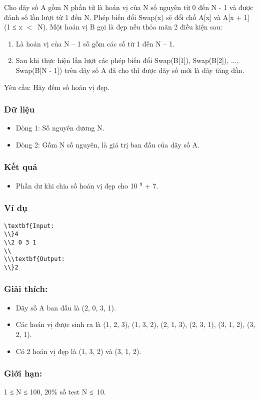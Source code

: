 



   Cho dãy số A gồm N phần tử là hoán vị của N số nguyên từ 0 đến N - 1 và được đánh số lần lượt từ 1 đến N. Phép biến đổi Swap(x) sẽ đổi chỗ A[x] và A[x + 1] (1 ≤ x $<$ N). Một hoán vị B gọi là đẹp nếu thỏa mãn 2 điều kiện sau:  
\begin{enumerate}
	\item     Là hoán vị của N – 1 số gồm các số từ 1 đến N – 1.   
	\item     Sau khi thực hiện lần lượt các phép biến đổi Swap(B[1]), Swap(B[2]), ..., Swap(B[N - 1]) trên dãy số A đã cho thì được dãy số mới là dãy tăng dần.   
\end{enumerate}

   Yêu cầu: Hãy đếm số hoán vị đẹp.  

\subsubsection{   Dữ liệu  }
\begin{itemize}
	\item     Dòng 1: Số nguyên dương N.   
	\item     Dòng 2: Gồm N số nguyên, là giá trị ban đầu của dãy số A.   
\end{itemize}

\subsubsection{   Kết quả  }
\begin{itemize}
	\item     Phần dư khi chia số hoán vị đẹp cho 10    $^     9    $    + 7.   
\end{itemize}

\subsubsection{   Ví dụ  }
\begin{verbatim}
\textbf{Input:
\\}4
\\2 0 3 1
\\
\\\textbf{Output:
\\}2\end{verbatim}

\subsubsection{   Giải thích:  }
\begin{itemize}
	\item     Dãy số A ban đầu là (2, 0, 3, 1).   
	\item     Các hoán vị được sinh ra là (1, 2, 3), (1, 3, 2), (2, 1, 3), (2, 3, 1), (3, 1, 2), (3, 2, 1).   
	\item     Có 2 hoán vị đẹp là (1, 3, 2) và (3, 1, 2).   
\end{itemize}

\subsubsection{\textbf{    Giới hạn:   }}

   1 ≤ N ≤ 100, 20\% số test N ≤ 10.  